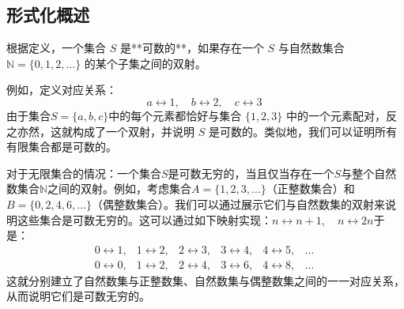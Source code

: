 \subsection{形式化概述}
根据定义，一个集合 $S$ 是**可数的**，如果存在一个 $S$ 与自然数集合 $\mathbb{N}=\{0,1,2,\dots\}$ 的某个子集之间的双射。

例如，定义对应关系：
$$
a \leftrightarrow 1, \quad b \leftrightarrow 2, \quad c \leftrightarrow 3~
$$
由于集合$S=\{a,b,c\}$中的每个元素都恰好与集合 $\{1,2,3\}$ 中的一个元素配对，反之亦然，这就构成了一个双射，并说明 $S$ 是可数的。类似地，我们可以证明所有有限集合都是可数的。

对于无限集合的情况：一个集合$S$是可数无穷的，当且仅当存在一个$S$与整个自然数集合$\mathbb{N}$之间的双射。例如，考虑集合$A = \{1,2,3,\dots\}$（正整数集合）和$B = \{0,2,4,6,\dots\}$（偶整数集合）。我们可以通过展示它们与自然数集的双射来说明这些集合是可数无穷的。这可以通过如下映射实现：$n\leftrightarrow n+1, \quad n \leftrightarrow 2n$于是：
$$
\begin{matrix}  
0 \leftrightarrow 1, & 1 \leftrightarrow 2, & 2 \leftrightarrow 3, & 3 \leftrightarrow 4, & 4 \leftrightarrow 5, & \dots \\[6pt]  
0 \leftrightarrow 0, & 1 \leftrightarrow 2, & 2 \leftrightarrow 4, & 3 \leftrightarrow 6, & 4 \leftrightarrow 8, & \dots  
\end{matrix} ~
$$
这就分别建立了自然数集与正整数集、自然数集与偶整数集之间的一一对应关系，从而说明它们是可数无穷的。
